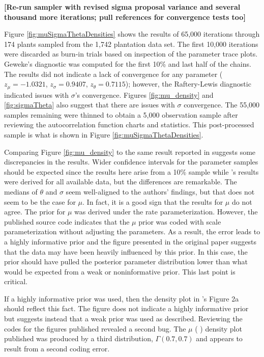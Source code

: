 \documentclass{uwstat572}
\newcommand{\vmcomment}[1]{({\color{blue}{VM's comment:}} \textbf{\color{blue}{#1}})}
\begin{document}
\textbf{[Re-run sampler with revised sigma proposal variance and several thousand more iterations; pull references for convergence tests too]}

Figure \ref{fig:muSigmaThetaDensities} shows the results of 65,000 iterations through 174 plants sampled from the 1,742 plantation data set. 
The first 10,000 iterations were discarded as burn-in trials based on inspection of the parameter trace plots. 
Geweke's diagnostic was computed for the first 10\% and last half of the chains. 
The results did not indicate a lack of convergence for any parameter ($z_{\mu} = -1.0321$, $z_{\sigma} = 0.9407$,  $z_{\theta} = 0.7115$); however, the Raftery-Lewis diagnostic indicated issues with $\sigma$'s convergence. 
Figures \ref{fig:mu_density} and \ref{fig:sigmaTheta} also suggest that there are issues with $\sigma$ convergence. 
The 55,000 samples remaining were thinned to obtain a 5,000 observation sample after reviewing the autocorrelation function charts and statistics. 
This post-processed sample is what is shown in Figure \ref{fig:muSigmaThetaDensities}. 

Comparing Figure \ref{fig:mu_density} to the same result reported in \citep{Brown} suggests some discrepancies in the results. 
Wider confidence intervals for the parameter samples should be expected since the results here arise from a 10\% sample while \cite{Brown}'s results were derived for all available data, but the differences are remarkable. 
The medians of $\theta$ and $\sigma$ seem well-aligned to the authors' findings, but that does not seem to be the case for $\mu$. 
In fact, it is a good sign that the results for $\mu$ do not agree. 
The prior for $\mu$ was derived under the rate parameterization. 
However, the published source code indicates that the $\mu$ prior was coded with scale parameterization without adjusting the parameters.
As a result, the error leads to a highly informative prior and the figure presented in the original paper suggests that the data may have been heavily influenced by this prior. 
In this case, the prior should have pulled the posterior parameter distribution lower than what would be expected from a weak or noninformative prior. 
This last point is critical. 

If a highly informative prior was used, then the density plot in \citet{Brown}'s Figure 2a should reflect this fact. 
The figure does not indicate a highly informative prior but suggests instead that a weak prior was used as described. 
Reviewing the codes for the figures published revealed a second bug. 
The  $\mu$ \vmcomment{posterior or pior?} density plot published was produced by a third distribution, $\Gamma(0.7, 0.7)$ and appears to result from a second coding error. 
\end{document}
